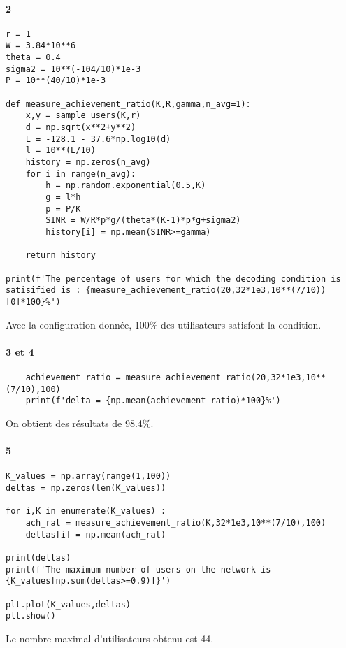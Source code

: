 \documentclass[a4paper,11pt,2]{article}
\begin{document}
\paragraph{2}
\begin{center}
\begin{lstlisting}
r = 1
W = 3.84*10**6
theta = 0.4
sigma2 = 10**(-104/10)*1e-3
P = 10**(40/10)*1e-3

def measure_achievement_ratio(K,R,gamma,n_avg=1):
    x,y = sample_users(K,r)
    d = np.sqrt(x**2+y**2)
    L = -128.1 - 37.6*np.log10(d)
    l = 10**(L/10)
    history = np.zeros(n_avg)
    for i in range(n_avg):
        h = np.random.exponential(0.5,K)
        g = l*h
        p = P/K
        SINR = W/R*p*g/(theta*(K-1)*p*g+sigma2)
        history[i] = np.mean(SINR>=gamma)

    return history

print(f'The percentage of users for which the decoding condition is satisified is : {measure_achievement_ratio(20,32*1e3,10**(7/10))[0]*100}%')
\end{lstlisting}
\end{center}

Avec la configuration donnée, 100\% des utilisateurs satisfont la condition.

\paragraph{3 et 4}
\begin{center}
\begin{lstlisting}
	achievement_ratio = measure_achievement_ratio(20,32*1e3,10**(7/10),100)
	print(f'delta = {np.mean(achievement_ratio)*100}%')
\end{lstlisting}
\end{center}

On obtient des résultats de 98.4\%.

\paragraph{5}
\begin{center}
\begin{lstlisting}
K_values = np.array(range(1,100))
deltas = np.zeros(len(K_values))

for i,K in enumerate(K_values) :
    ach_rat = measure_achievement_ratio(K,32*1e3,10**(7/10),100)
    deltas[i] = np.mean(ach_rat)

print(deltas)
print(f'The maximum number of users on the network is {K_values[np.sum(deltas>=0.9)]}')

plt.plot(K_values,deltas)
plt.show()
\end{lstlisting}
\end{center}
Le nombre maximal d'utilisateurs obtenu est 44.
\end{document}
